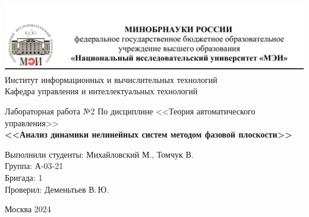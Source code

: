 \begin{titlepage}
	\newpage
	\begin{center}
		\includegraphics[width=\textwidth]{png/tit.png}
		Институт информационных и вычислительных технологий \\
		Кафедра управления и интеллектуальных технологий
		\vspace{1.25cm}
	\end{center}
	
	\vspace{1.2em}
	
	\begin{center}
		\begin{spacing}{1}
			{\Large Лабораторная работа №2\linebreak
				По дисциплине <<Теория автоматического управления>> \\}
			\large{\bf<<Анализ динамики нелинейных систем методом фазовой плоскости>>}
		\end{spacing}
	\end{center}
	
	\vspace{5em}
	
	
	\vspace{6em}
	
	\noindent Выполнили студенты: Михайловский М., Томчук В. \\
	Группа: А-03-21 \\
	Бригада: 1\\
	Проверил: Деменьтьев В.\,Ю.
	
	
	\vspace{\fill}
	
	\begin{center}
		Москва 2024
	\end{center}
	
\end{titlepage}